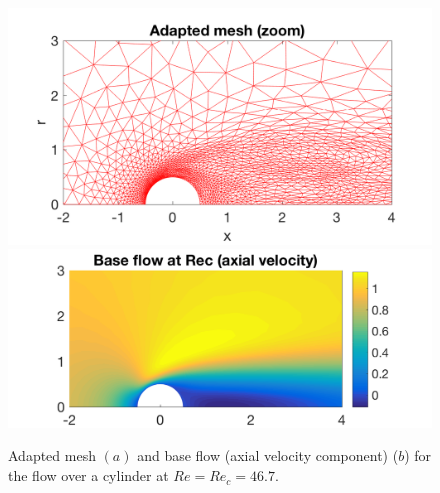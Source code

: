 \documentclass[twocolumn,10pt]{asme2ej}
\begin{document}
\begin{figure}
\includegraphics[width=.9 \linewidth]{Cylinder_Mesh.png}
\includegraphics[width=.9 \linewidth]{Cylinder_BaseFlowReC.png}
\caption{Adapted mesh $(a)$  and base flow (axial velocity component) ($b$) for the flow over a cylinder at $Re=Re_c = 46.7$.}
\label{fig:Baseflow}
\end{figure}
\end{document}
